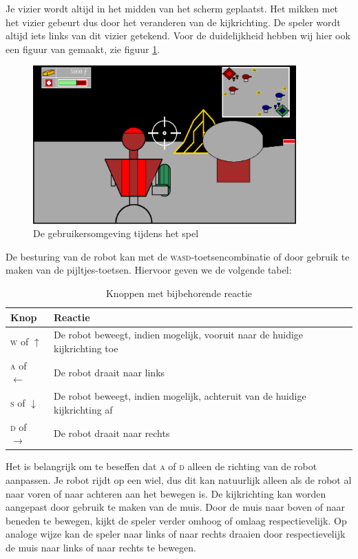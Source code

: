    Je vizier wordt altijd in het midden van het scherm geplaatst. Het mikken met het vizier gebeurt dus door het veranderen van de kijkrichting. De speler wordt altijd iets links van dit vizier getekend. Voor de duidelijkheid hebben wij hier ook een figuur van gemaakt, zie figuur \ref{fig:UI}.
    \begin{figure}[H]
    \includegraphics[width=0.9\textwidth]{../Graphics/UI.eps}
    \caption{De gebruikersomgeving tijdens het spel}
    \label{fig:UI}
    \end{figure}
    De besturing van de robot kan met de \textsc{wasd}-toetsencombinatie of door gebruik te maken van de pijltjes-toetsen. Hiervoor geven we de volgende tabel:
    \begin{table}[H]
        \small
        \centering
        \begin{tabular}{| l | l |}
        \hline
        Knop & Reactie \\ \hline
        \textsc{w} of $\uparrow$ & De robot beweegt, indien mogelijk, vooruit naar de huidige kijkrichting toe \\ \hline
        \textsc{a} of $\leftarrow$ & De robot draait naar links \\ \hline
        \textsc{s} of $\downarrow$ & De robot beweegt, indien mogelijk, achteruit van de huidige kijkrichting af \\ \hline
        \textsc{d} of $\rightarrow$ & De robot draait naar rechts \\ \hline
        \end{tabular}
        \caption{Knoppen met bijbehorende reactie}
        \label{tab:planning}
    \end{table}

    Het is belangrijk om te beseffen dat \textsc{a} of \textsc{d} alleen de richting van de robot aanpassen. Je robot rijdt op een wiel, dus dit kan natuurlijk alleen als de robot al naar voren of naar achteren aan het bewegen is. De kijkrichting kan worden aangepast door gebruik te maken van de muis. Door de muis naar boven of naar beneden te bewegen, kijkt de speler verder omhoog of omlaag respectievelijk. Op analoge wijze kan de speler naar links of naar rechts draaien door respectievelijk de muis naar links of naar rechts te bewegen.
    

